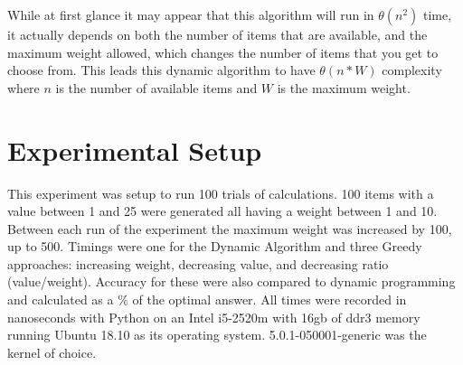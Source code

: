 \documentclass[10pt, letterpaper]{article}
\begin{document}
\medskip
While at first glance it may appear that this algorithm will run in $\theta(n^2)$ time, it actually depends on both the number of items that are available, and the maximum weight allowed, which changes the number of items that you get to choose from. This leads this dynamic algorithm to have $\theta(n * W)$ complexity where $n$ is the number of available items and $W$ is the maximum weight.
\section{Experimental Setup}
This experiment was setup to run 100 trials of calculations. 100 items with a value between 1 and 25 were generated all having a weight between 1 and 10. Between each run of the experiment the maximum weight was increased by 100, up to 500. Timings were one for the Dynamic Algorithm and three Greedy approaches: increasing weight, decreasing value, and decreasing ratio (value/weight). Accuracy for these were also compared to dynamic programming and calculated as a \% of the optimal answer. All times were recorded in nanoseconds with Python on an Intel i5-2520m with 16gb of ddr3 memory running Ubuntu 18.10 as its operating system. 5.0.1-050001-generic was the kernel of choice.
\end{document}
